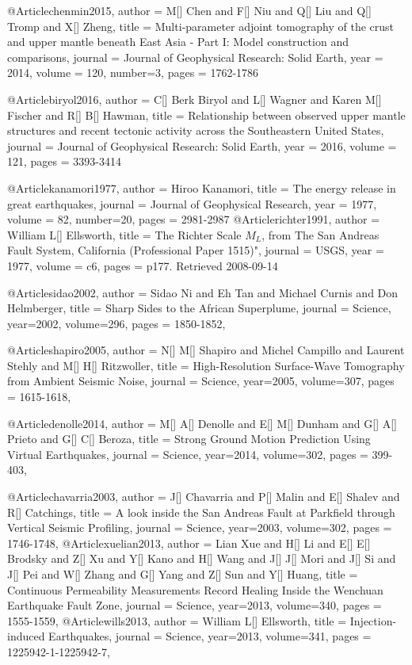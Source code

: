 @Article{chenmin2015,
  author = 	 {M[] Chen and F[] Niu and Q[] Liu and Q[] Tromp and X[] Zheng},
  title = 	 {Multi‐parameter adjoint tomography of the crust and upper mantle beneath {E}ast {A}sia - {P}art I: {M}odel construction and comparisons},
  journal = 	 {Journal of Geophysical Research: Solid Earth},
  year = 	 2014,
  volume = 120,
  number=3,
  pages =	 {1762-1786}
}


@Article{biryol2016,
  author = 	 {C[] Berk Biryol and L[] Wagner and Karen M[] Fischer and R[] B[] Hawman},
  title = 	 {Relationship between observed upper mantle structures and recent tectonic activity across the Southeastern United States},
  journal = 	 {Journal of Geophysical Research: Solid Earth},
  year = 	 2016,
  volume = 121,
  pages =	 {3393-3414}
}

@Article{kanamori1977,
  author = 	 {Hiroo Kanamori},
  title = 	 {The energy release in great earthquakes},
  journal = 	 {Journal of Geophysical Research},
  year = 	 1977,
  volume = 82,
  number=20,
  pages =	 {2981-2987}
}
@Article{richter1991,
  author = 	 {William L[] Ellsworth},
  title = 	 {The Richter Scale $M_L$, from The San Andreas Fault System, California (Professional Paper 1515)"},
  journal = 	 {USGS},
  year = 	 1977,
  volume = c6,
  pages =	 {p177. Retrieved 2008-09-14}
}



@Article{sidao2002,
  author =	 {Sidao Ni and Eh Tan and Michael Curnis and Don Helmberger},
  title =	 {Sharp Sides to the African Superplume},
  journal =	 {Science},
  year=2002,
  volume=296,
  pages =	 {1850-1852},
}

@Article{shapiro2005,
  author =	 {N[] M[] Shapiro and Michel Campillo and Laurent Stehly and M[] H[] Ritzwoller},
  title =	 {High-Resolution Surface-Wave Tomography from Ambient Seismic Noise},
  journal =	 {Science},
  year=2005,
  volume=307,
  pages =	 {1615-1618},
}

@Article{denolle2014,
  author =	 {M[] A[] Denolle and E[] M[] Dunham and G[] A[] Prieto and G[] C[] Beroza},
  title =	 {Strong Ground Motion Prediction Using Virtual Earthquakes},
  journal =	 {Science},
  year=2014,
  volume=302,
  pages =	 {399-403},
}

@Article{chavarria2003,
  author =	 {J[] Chavarria and P[] Malin and E[] Shalev and R[] Catchings},
  title =	 {A look inside the San Andreas Fault at Parkfield through Vertical Seismic Profiling},
  journal =	 {Science},
  year=2003,
  volume=302,
  pages =	 {1746-1748},
}
@Article{xuelian2013,
  author =	 {Lian Xue and H[] Li and E[] E[] Brodsky and Z[] Xu and Y[] Kano and H[] Wang and J[] J[] Mori and J[] Si and J[] Pei and W[] Zhang and G[] Yang and Z[] Sun and Y[] Huang},
  title =	 {Continuous Permeability Measurements Record Healing Inside the Wenchuan Earthquake Fault Zone},
  journal =	 {Science},
  year=2013,
  volume=340,
  pages =	 {1555-1559},
}
@Article{wills2013,
  author =	 {William L[] Ellsworth},
  title =	 {Injection-induced Earthquakes},
  journal =	 {Science},
  year=2013,
  volume=341,
  pages =	 {1225942-1-1225942-7},
}

